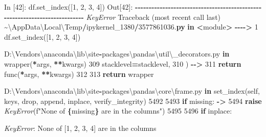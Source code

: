 \documentclass[
]{book}
\newenvironment{Shaded}{\begin{snugshade}}{\end{snugshade}}
\newcommand{\ControlFlowTok}[1]{\textcolor[rgb]{0.13,0.29,0.53}{\textbf{#1}}}
\newcommand{\DecValTok}[1]{\textcolor[rgb]{0.00,0.00,0.81}{#1}}
\newcommand{\ErrorTok}[1]{\textcolor[rgb]{0.64,0.00,0.00}{\textbf{#1}}}
\newcommand{\FloatTok}[1]{\textcolor[rgb]{0.00,0.00,0.81}{#1}}
\newcommand{\KeywordTok}[1]{\textcolor[rgb]{0.13,0.29,0.53}{\textbf{#1}}}
\newcommand{\NormalTok}[1]{#1}
\newcommand{\OperatorTok}[1]{\textcolor[rgb]{0.81,0.36,0.00}{\textbf{#1}}}
\newcommand{\PreprocessorTok}[1]{\textcolor[rgb]{0.56,0.35,0.01}{\textit{#1}}}
\newcommand{\SpecialCharTok}[1]{\textcolor[rgb]{0.81,0.36,0.00}{\textbf{#1}}}
\newcommand{\SpecialStringTok}[1]{\textcolor[rgb]{0.31,0.60,0.02}{#1}}
\newcommand{\StringTok}[1]{\textcolor[rgb]{0.31,0.60,0.02}{#1}}
\newcommand{\VariableTok}[1]{\textcolor[rgb]{0.00,0.00,0.00}{#1}}
\begin{document}
\begin{Shaded}
\begin{Highlighting}[]
\NormalTok{In [}\DecValTok{42}\NormalTok{]: df.set\_index([}\DecValTok{1}\NormalTok{, }\DecValTok{2}\NormalTok{, }\DecValTok{3}\NormalTok{, }\DecValTok{4}\NormalTok{])}
\NormalTok{Out[}\DecValTok{42}\NormalTok{]:}
\OperatorTok{{-}{-}{-}{-}{-}{-}{-}{-}{-}{-}{-}{-}{-}{-}{-}{-}{-}{-}{-}{-}{-}{-}{-}{-}{-}{-}{-}{-}{-}{-}{-}{-}{-}{-}{-}{-}{-}{-}{-}{-}{-}{-}{-}{-}{-}{-}{-}{-}{-}{-}{-}{-}{-}{-}{-}{-}{-}{-}{-}{-}{-}{-}{-}{-}{-}{-}{-}{-}{-}{-}{-}{-}{-}{-}{-}}
\PreprocessorTok{KeyError}\NormalTok{                                  Traceback (most recent call last)}
\OperatorTok{\textasciitilde{}}\NormalTok{\textbackslash{}AppData\textbackslash{}Local\textbackslash{}Temp}\OperatorTok{/}\NormalTok{ipykernel\_1380}\OperatorTok{/}\FloatTok{3577861036.}\ErrorTok{py} \KeywordTok{in} \OperatorTok{\textless{}}\NormalTok{module}\OperatorTok{\textgreater{}}
\OperatorTok{{-}{-}{-}{-}\textgreater{}} \DecValTok{1}\NormalTok{ df.set\_index([}\DecValTok{1}\NormalTok{, }\DecValTok{2}\NormalTok{, }\DecValTok{3}\NormalTok{, }\DecValTok{4}\NormalTok{])}

\NormalTok{D:\textbackslash{}Vendors\textbackslash{}anaconda\textbackslash{}lib\textbackslash{}site}\OperatorTok{{-}}\NormalTok{packages\textbackslash{}pandas\textbackslash{}util\textbackslash{}\_decorators.py }\KeywordTok{in}\NormalTok{ wrapper(}\OperatorTok{*}\NormalTok{args, }\OperatorTok{**}\NormalTok{kwargs)}
    \DecValTok{309}\NormalTok{                     stacklevel}\OperatorTok{=}\NormalTok{stacklevel,}
    \DecValTok{310}\NormalTok{                 )}
\OperatorTok{{-}{-}\textgreater{}} \DecValTok{311}             \ControlFlowTok{return}\NormalTok{ func(}\OperatorTok{*}\NormalTok{args, }\OperatorTok{**}\NormalTok{kwargs)}
    \DecValTok{312} 
    \DecValTok{313}         \ControlFlowTok{return}\NormalTok{ wrapper}

\NormalTok{D:\textbackslash{}Vendors\textbackslash{}anaconda\textbackslash{}lib\textbackslash{}site}\OperatorTok{{-}}\NormalTok{packages\textbackslash{}pandas\textbackslash{}core\textbackslash{}frame.py }\KeywordTok{in}\NormalTok{ set\_index(}\VariableTok{self}\NormalTok{, keys, drop, append, inplace, verify\_integrity)}
   \DecValTok{5492} 
   \DecValTok{5493}         \ControlFlowTok{if}\NormalTok{ missing:}
\OperatorTok{{-}\textgreater{}} \DecValTok{5494}             \ControlFlowTok{raise} \PreprocessorTok{KeyError}\NormalTok{(}\SpecialStringTok{f"None of }\SpecialCharTok{\{}\NormalTok{missing}\SpecialCharTok{\}}\SpecialStringTok{ are in the columns"}\NormalTok{)}
   \DecValTok{5495} 
   \DecValTok{5496}         \ControlFlowTok{if}\NormalTok{ inplace:}

\PreprocessorTok{KeyError}\NormalTok{: }\StringTok{\textquotesingle{}None of [1, 2, 3, 4] are in the columns\textquotesingle{}}
\end{Highlighting}
\end{Shaded}
\end{document}
